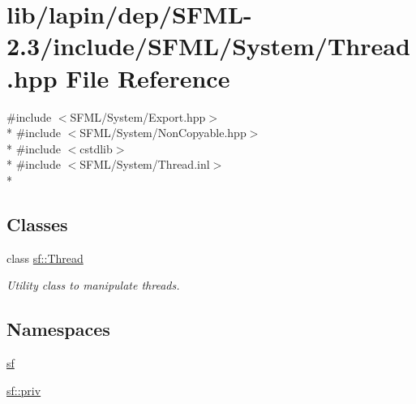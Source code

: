 \hypertarget{lapin_2dep_2_s_f_m_l-2_83_2include_2_s_f_m_l_2_system_2_thread_8hpp}{\section{lib/lapin/dep/\-S\-F\-M\-L-\/2.3/include/\-S\-F\-M\-L/\-System/\-Thread.hpp File Reference}
\label{lapin_2dep_2_s_f_m_l-2_83_2include_2_s_f_m_l_2_system_2_thread_8hpp}
}
{\ttfamily \#include $<$S\-F\-M\-L/\-System/\-Export.\-hpp$>$}\\*
{\ttfamily \#include $<$S\-F\-M\-L/\-System/\-Non\-Copyable.\-hpp$>$}\\*
{\ttfamily \#include $<$cstdlib$>$}\\*
{\ttfamily \#include $<$S\-F\-M\-L/\-System/\-Thread.\-inl$>$}\\*
\subsection*{Classes}
\begin{DoxyCompactItemize}
\item 
class \hyperlink{classsf_1_1_thread}{sf\-::\-Thread}
\begin{DoxyCompactList}\small\item\em Utility class to manipulate threads. \end{DoxyCompactList}\end{DoxyCompactItemize}
\subsection*{Namespaces}
\begin{DoxyCompactItemize}
\item 
\hyperlink{namespacesf}{sf}
\item 
\hyperlink{namespacesf_1_1priv}{sf\-::priv}
\end{DoxyCompactItemize}
